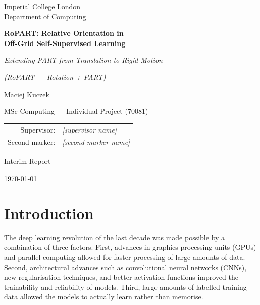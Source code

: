 \documentclass[11pt,a4paper]{report}
\begin{document}
\begin{titlepage}
  \centering
  \vspace*{1.5cm}

  {\large Imperial College London \\[0.3em] Department of Computing\par}
  \vspace{2.0cm}

  {\LARGE\bfseries RoPART: Relative Orientation in \\[0.4em]
   Off-Grid Self-Supervised Learning\par}
  \vspace{1.0cm}

  {\large\itshape Extending PART from Translation to Rigid Motion\par}
  \vspace{0.4em}
  {\normalsize\itshape (RoPART --- Rotation + PART)\par}
  \vspace{2.0cm}

  {\large Maciej Kuczek\par}
  \vspace{0.4cm}
  {\normalsize MSc Computing --- Individual Project (70081)\par}
  \vspace{2.0cm}

  \begin{tabular}{rl}
    Supervisor:    & \textit{[supervisor name]} \\[0.3em]
    Second marker: & \textit{[second-marker name]} \\
  \end{tabular}

  \vfill
  {\normalsize Interim Report\par}
  {\normalsize \today\par}
\end{titlepage}

\tableofcontents
\clearpage

\chapter{Introduction}
The deep learning revolution of the last decade was made possible by a combination of three factors. First, advances in graphics processing units (GPUs) and parallel computing allowed for faster processing of large amounts of data. Second, architectural advances such as convolutional neural networks (CNNs), new regularisation techniques, and better activation functions improved the trainability and reliability of models. Third, large amounts of labelled training data allowed the models to actually learn rather than memorise. 
\end{document}
